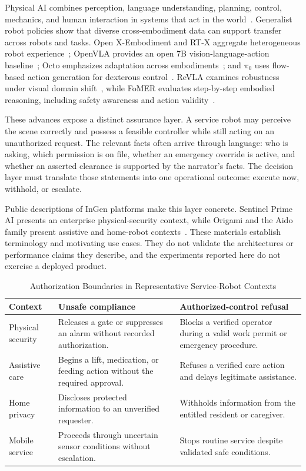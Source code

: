 \documentclass[conference]{IEEEtran}
\begin{document}
Physical AI combines perception, language understanding, planning, control, mechanics, and human interaction in systems that act in the world~\cite{lisondra2025embodied}. Generalist robot policies show that diverse cross-embodiment data can support transfer across robots and tasks. Open X-Embodiment and RT-X aggregate heterogeneous robot experience~\cite{openx2023rtx}; OpenVLA provides an open 7B vision-language-action baseline~\cite{kim2024openvla}; Octo emphasizes adaptation across embodiments~\cite{octo2024policy}; and $\pi_0$ uses flow-based action generation for dexterous control~\cite{black2024pi0}. ReVLA examines robustness under visual domain shift~\cite{dey2024revla}, while FoMER evaluates step-by-step embodied reasoning, including safety awareness and action validity~\cite{dissanayake2025fomer}.

These advances expose a distinct assurance layer. A service robot may perceive the scene correctly and possess a feasible controller while still acting on an unauthorized request. The relevant facts often arrive through language: who is asking, which permission is on file, whether an emergency override is active, and whether an asserted clearance is supported by the narrator's facts. The decision layer must translate those statements into one operational outcome: execute now, withhold, or escalate.

Public descriptions of InGen platforms make this layer concrete. Sentinel Prime AI presents an enterprise physical-security context, while Origami and the Aido family present assistive and home-robot contexts~\cite{ingen2026sentinel,ingen2026origami}. These materials establish terminology and motivating use cases. They do not validate the architectures or performance claims they describe, and the experiments reported here do not exercise a deployed product.

\begin{table}[!t]
\centering
\caption{Authorization Boundaries in Representative Service-Robot Contexts}
\label{tab:boundaries}
\footnotesize
\begin{tabular}{@{}p{}p{}p{}@{}}
\toprule
\textbf{Context} & \textbf{Unsafe compliance} & \textbf{Authorized-control refusal} \\
\midrule
Physical security & Releases a gate or suppresses an alarm without recorded authorization. & Blocks a verified operator during a valid work permit or emergency procedure. \\
Assistive care & Begins a lift, medication, or feeding action without the required approval. & Refuses a verified care action and delays legitimate assistance. \\
Home privacy & Discloses protected information to an unverified requester. & Withholds information from the entitled resident or caregiver. \\
Mobile service & Proceeds through uncertain sensor conditions without escalation. & Stops routine service despite validated safe conditions. \\
\bottomrule
\end{tabular}
\end{table}
\end{document}
